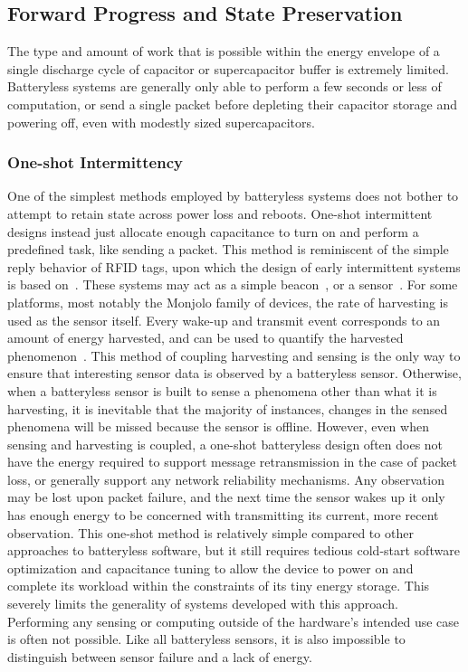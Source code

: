 \subsection{Forward Progress and State Preservation}
The type and amount of work that is possible within the energy envelope of a single discharge cycle of capacitor or supercapacitor buffer is extremely limited.
Batteryless systems are generally only able to perform a few seconds or less of computation, or send a single packet before depleting their capacitor storage and powering off, even with modestly sized supercapacitors.

\subsubsection{One-shot Intermittency}
\label{cha:background:one-shot}
One of the simplest methods employed by batteryless systems does not bother to attempt to retain state across power loss and reboots.
One-shot intermittent designs instead just allocate enough capacitance to turn on and perform a predefined task, like sending a packet.
This method is reminiscent of the simple reply behavior of RFID tags, upon which the design of early intermittent systems is based on~\cite{sample2008design}.
These systems may act as a simple beacon~\cite{campbell2016cinamin,saoda2019no}, or a sensor~\cite{yervaGrafting12, debruin2013monjolo, campbellEnergy14, campbellThermes14}.
For some platforms, most notably the Monjolo family of devices, the rate of harvesting is used as the sensor itself. Every wake-up and transmit event corresponds to an amount of energy harvested, and can be used to quantify the harvested phenomenon~\cite{campbellThermes14, campbellEnergy14, debruin2013monjolo}.
This method of coupling harvesting and sensing is the only way to ensure that interesting sensor data is observed by a batteryless sensor.
Otherwise, when a batteryless sensor is built to sense a phenomena other than what it is harvesting, it is inevitable that the majority of instances, changes in the sensed phenomena will be missed because the sensor is offline.
However, even when sensing and harvesting is coupled, a one-shot batteryless design often does not have the energy required to support message retransmission in the case of packet loss, or generally support any network reliability mechanisms. 
Any observation may be lost upon packet failure, and the next time the sensor wakes up it only has enough energy to be concerned with transmitting its current, more recent observation.
This one-shot method is relatively simple compared to other approaches to batteryless software, but it still requires tedious cold-start software optimization and capacitance tuning to allow the device to power on and complete its workload within the constraints of its tiny energy storage.
This severely limits the generality of systems developed with this approach.
Performing any sensing or computing outside of the hardware's intended use case is often not possible.
Like all batteryless sensors, it is also impossible to distinguish between sensor failure and a lack of energy.

